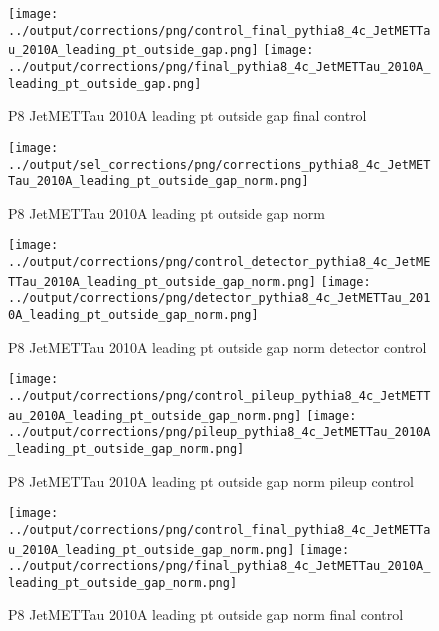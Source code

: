\documentclass[11pt]{book}
\begin{document}
\begin{figure}[ht]
\centering
\texttt{[image: ../output/corrections/png/control\_final\_pythia8\_4c\_JetMETTau\_2010A\_leading\_pt\_outside\_gap.png]}
\texttt{[image: ../output/corrections/png/final\_pythia8\_4c\_JetMETTau\_2010A\_leading\_pt\_outside\_gap.png]}
\caption{P8 JetMETTau 2010A leading pt outside gap final control}
\label{fig:p8_JetMETTau_2010A_leading_pt_outside_gap_final_control}
\end{figure}



\begin{figure}[ht]
\centering
\texttt{[image: ../output/sel\_corrections/png/corrections\_pythia8\_4c\_JetMETTau\_2010A\_leading\_pt\_outside\_gap\_norm.png]}
\caption{P8 JetMETTau 2010A leading pt outside gap norm}
\label{fig:p8_JetMETTau_2010A_leading_pt_outside_gap_norm}
\end{figure}

\begin{figure}[ht]
\centering
\texttt{[image: ../output/corrections/png/control\_detector\_pythia8\_4c\_JetMETTau\_2010A\_leading\_pt\_outside\_gap\_norm.png]}
\texttt{[image: ../output/corrections/png/detector\_pythia8\_4c\_JetMETTau\_2010A\_leading\_pt\_outside\_gap\_norm.png]}
\caption{P8 JetMETTau 2010A leading pt outside gap norm detector control}
\label{fig:p8_JetMETTau_2010A_leading_pt_outside_gap_norm_detector_control}
\end{figure}

\begin{figure}[ht]
\centering
\texttt{[image: ../output/corrections/png/control\_pileup\_pythia8\_4c\_JetMETTau\_2010A\_leading\_pt\_outside\_gap\_norm.png]}
\texttt{[image: ../output/corrections/png/pileup\_pythia8\_4c\_JetMETTau\_2010A\_leading\_pt\_outside\_gap\_norm.png]}
\caption{P8 JetMETTau 2010A leading pt outside gap norm pileup control}
\label{fig:p8_JetMETTau_2010A_leading_pt_outside_gap_norm_pileup_control}
\end{figure}


\begin{figure}[ht]
\centering
\texttt{[image: ../output/corrections/png/control\_final\_pythia8\_4c\_JetMETTau\_2010A\_leading\_pt\_outside\_gap\_norm.png]}
\texttt{[image: ../output/corrections/png/final\_pythia8\_4c\_JetMETTau\_2010A\_leading\_pt\_outside\_gap\_norm.png]}
\caption{P8 JetMETTau 2010A leading pt outside gap norm final control}
\label{fig:p8_JetMETTau_2010A_leading_pt_outside_gap_norm_final_control}
\end{figure}
\end{document}
